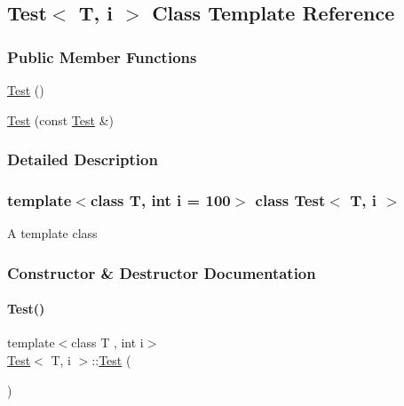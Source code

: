\hypertarget{class_test}{}\subsection{Test$<$ T, i $>$ Class Template Reference}
\label{class_test}
\subsubsection*{Public Member Functions}
\begin{DoxyCompactItemize}
\item 
\mbox{\hyperlink{class_test_a44e3a28c552193de099601e2910531f1}{Test}} ()
\item 
\mbox{\hyperlink{class_test_adcf1bc755df94c4d07519c0a02aa1cc0}{Test}} (const \mbox{\hyperlink{class_test}{Test}} \&)
\end{DoxyCompactItemize}


\subsubsection{Detailed Description}
\subsubsection*{template$<$class T, int i = 100$>$\newline
class Test$<$ T, i $>$}

A template class 

\subsubsection{Constructor \& Destructor Documentation}
\mbox{\label{class_test_a44e3a28c552193de099601e2910531f1}} 
\paragraph{\texorpdfstring{Test()}{Test()}\hspace{0.1cm}{\footnotesize\ttfamily [1/2]}}
{\footnotesize\ttfamily template$<$class T , int i$>$ \\
\mbox{\hyperlink{class_test}{Test}}$<$ T, i $>$\+::\mbox{\hyperlink{class_test}{Test}} (\begin{DoxyParamCaption}{ }\end{DoxyParamCaption})}

